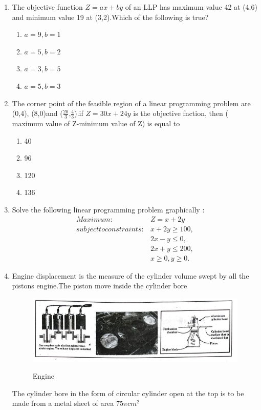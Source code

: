 \documentclass{article}
\begin{document}
\begin{enumerate}
	\item The objective function $Z = ax+by$ of an LLP has maximum value 42 at (4,6) and minimum value 19 at (3,2).Which of the following is true?
		
  		\begin{enumerate}
				\item $a=9,b=1$
		        	\item $a=5,b=2$
				\item $a= 3,b=5$
				\item $a=5,b=3$
			
		\end{enumerate}
		
	\item The corner point of the feasible region of a linear programming problem are (0,4), (8,0)and ($\frac{20}{3}$,$\frac{4}{3}$).if $ Z=30x+24y $ is the objective fnction, then ( maximum value of Z-minimum value of Z) is equal to 
		
		\begin{enumerate}
				\item 40
				\item 96
				\item 120
				\item 136
		\end{enumerate}
		
		
	\item 
	 Solve the following linear programming problem graphically :
\begin{align}
	Maximum:& Z=x+2y \nonumber \\
	subject to constraints 
	     :& x+2y\ge100 ,\nonumber\\
             &  2x-y\le0 ,\nonumber\\
	     &  2x+y\le200 ,\nonumber\\
   	     &   x\ge0 ,y\ge0 .\nonumber
\end{align}
				

			      \item
		Engine displacement is the measure of the cylinder volume swept by all the pistons engine.The piston move inside the cylinder bore \\
		
		\begin{figure}[htbp]
	\includegraphics[width=1 \columnwidth]{engine.jpg}\\
			\caption{Engine}
			\label{fig:pic}  \end{figure}
		The cylinder bore in the form of circular cylinder open at the top is to be made from a metal sheet of area $ 75 \pi cm^2 $ \\
 	

\end{enumerate}
\end{document}
